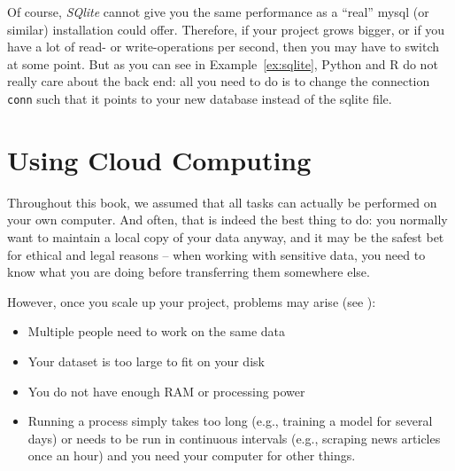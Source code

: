 
Of course, \emph{SQlite} cannot give you the same performance as a ``real'' mysql (or similar) installation could offer. Therefore, if your project grows bigger, or if you have a lot of read-
 or
write-operations per second, then you may have to switch at some
point. But as you can see in Example~\ref{ex:sqlite}, Python and R do not
really care about the back end: all you need to do is to change the
connection \verb|conn| such that it points to your new database instead of
the sqlite file.


%

\section{Using Cloud Computing}
\label{sec:cloudcomputing}

Throughout this book, we assumed that all tasks can actually be
performed on your own computer. And often, that is indeed the best
thing to do: you normally want to maintain a local copy of your data
anyway, and it may be the safest bet for ethical and legal reasons --
when working with sensitive data, you need to know what you are doing
before transferring them somewhere else.

However, once you scale up your project, problems may arise (see \cite{Trilling2018b}):
\begin{itemize}
\item Multiple people need to work on the same data
\item Your dataset is too large to fit on your disk
\item You do not have enough RAM or processing power
\item Running a process simply takes too long (e.g., training a model
  for several days) or needs to be run in continuous intervals (e.g.,
  scraping news articles once an hour) and you need your computer for
  other things.
\end{itemize}


